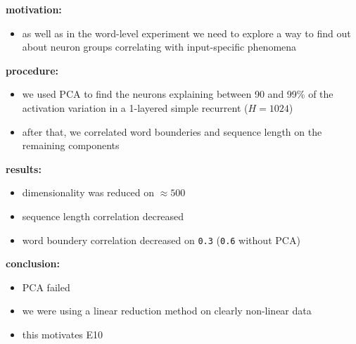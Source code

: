 \begin{frame}{\expvii}
	\textbf{motivation:}
	\begin{itemize}
		\item as well as in the word-level experiment we need to explore a way to find out about neuron groups correlating with input-specific phenomena		
	\end{itemize}
	\textbf{procedure:}
	\begin{itemize}
		\item we used PCA to find the neurons explaining between 90 and 99\% of the activation variation in a 1-layered simple recurrent ($H=1024$)
		\item after that, we correlated word bounderies and sequence length on the remaining components
	\end{itemize}
\end{frame}
\begin{frame}{\expvii}
	\textbf{results:}
	\begin{itemize}
		\item dimensionality was reduced on $\approx 500$
		\item sequence length correlation decreased  
		\item word boundery correlation decreased on \texttt{0.3} (\texttt{0.6} without PCA)
	\end{itemize}
	\textbf{conclusion:}
	\begin{itemize}
		\item PCA failed
		\item we were using a linear reduction method on clearly non-linear data
		\item this motivates E10
	\end{itemize}
\end{frame}
